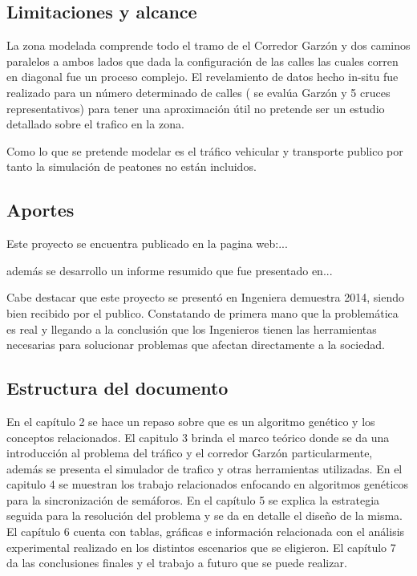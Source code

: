 \subsection{Limitaciones y alcance}

La zona modelada comprende todo el tramo de el Corredor Garzón y dos caminos paralelos a ambos lados que dada la configuración de las calles las cuales corren en diagonal fue un proceso complejo.
El revelamiento de datos hecho in-situ fue realizado para un número determinado de calles ( se evalúa Garzón y 5 cruces representativos) para tener una aproximación útil no pretende ser un estudio detallado sobre el trafico en la zona.

Como lo que se pretende modelar es el tráfico vehicular y transporte publico por tanto la simulación de peatones no están incluidos.


\subsection{Aportes}

Este proyecto se encuentra publicado en la pagina web:...

además se desarrollo un informe resumido que fue presentado en... 

Cabe destacar que este proyecto se presentó en Ingeniera demuestra 2014, siendo bien recibido por el publico. Constatando de primera mano que la problemática es real y llegando a la conclusión que los Ingenieros tienen las herramientas necesarias para solucionar problemas que afectan directamente a la sociedad.

\subsection{Estructura del documento}
En el capítulo 2 se hace un repaso sobre que es un algoritmo genético y los conceptos relacionados.
El capitulo 3 brinda el marco teórico donde se da una introducción al problema del tráfico y el corredor Garzón particularmente, además se presenta el simulador de trafico y otras herramientas utilizadas.
En el capitulo 4 se muestran los trabajo relacionados enfocando en algoritmos genéticos para la sincronización de semáforos.
En el capítulo 5 se explica la estrategia seguida para la resolución del problema y se da en detalle el diseño de la misma.
El capítulo 6 cuenta con tablas, gráficas e información relacionada con el análisis experimental realizado en los distintos escenarios que se eligieron.
El capítulo 7 da las conclusiones finales y el trabajo a futuro que se puede realizar.






